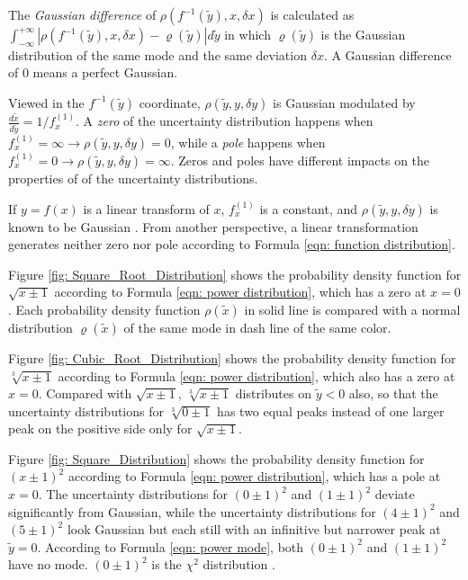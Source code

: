 \documentclass[twoside]{article}
\numberwithin{equation}{section}
\begin{document}
The \emph{Gaussian difference} of $\rho(f^{-1}(\tilde{y}), x, \delta x)$ is calculated as $\int_{-\infty}^{+\infty} |\rho(f^{-1}(\tilde{y}), x, \delta x) - \varrho(\tilde{y})| d \tilde{y}$ in which $\varrho(\tilde{y})$ is the Gaussian distribution of the same mode and the same deviation $\delta x$.
A Gaussian difference of 0 means a perfect Gaussian.

Viewed in the $f^{-1}(\tilde{y})$ coordinate, $\rho(\tilde{y}, y, \delta y)$ is Gaussian modulated by $\frac{d\tilde{x}}{d\tilde{y}} = 1/f^{(1)}_x$.
A \emph{zero} of the uncertainty distribution happens when $f^{(1)}_x=\infty \rightarrow \rho(\tilde{y}, y, \delta y) = 0$, while a \emph{pole} happens when $f^{(1)}_x=0 \rightarrow \rho(\tilde{y}, y, \delta y) = \infty$.
Zeros and poles have different impacts on the properties of of the uncertainty distributions.

If $y=f(x)$ is a linear transform of $x$, $f^{(1)}_x$ is a constant, and $\rho(\tilde{y}, y, \delta y)$ is known to be Gaussian \cite{Probability_Statistics}.
From another perspective, a linear transformation generates neither zero nor pole according to Formula \eqref{eqn: function distribution}.

Figure \ref{fig: Square_Root_Distribution} shows the probability density function for $\sqrt{x \pm 1}$ according to Formula \eqref{eqn: power distribution}, which has a zero at $x=0$.
Each probability density function $\rho(\tilde{x})$ in solid line is compared with a normal distribution $\varrho(\tilde{x})$ of the same mode in dash line of the same color.

Figure \ref{fig: Cubic_Root_Distribution} shows the probability density function for $\sqrt[3]{x \pm 1}$ according to Formula \eqref{eqn: power distribution}, which also has a zero at $x=0$.
Compared with $\sqrt{x \pm 1}$, $\sqrt[3]{x \pm 1}$ distributes on $\tilde{y} < 0$ also, so that the uncertainty distributions for $\sqrt[3]{0 \pm 1}$ has two equal peaks instead of one larger peak on the positive side only for $\sqrt{x \pm 1}$.

Figure \ref{fig: Square_Distribution} shows the probability density function for $(x \pm 1)^2$ according to Formula \eqref{eqn: power distribution}, which has a pole at $x=0$.
The uncertainty distributions for $(0 \pm 1)^2$ and $(1 \pm 1)^2$ deviate significantly from Gaussian, while the uncertainty distributions for $(4 \pm 1)^2$ and $(5 \pm 1)^2$ look Gaussian but each still with an infinitive but narrower peak at $\tilde{y} = 0$.
According to Formula \eqref{eqn: power mode}, both $(0 \pm 1)^2$ and $(1 \pm 1)^2$ have no mode.
$(0 \pm 1)^2$ is the $\chi^2$ distribution \cite{Statistical_Methods}.
\end{document}
